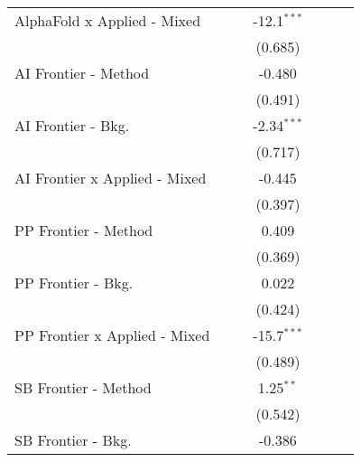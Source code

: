 \begin{tabular}{lcccccc}
   AlphaFold x Applied - Mixed   &              &               & -12.1$^{***}$ &             &        &   \\   
                                 &              &               & (0.685)       &             &        &   \\   
   AI Frontier - Method          &              &               & -0.480        &             &        &   \\   
                                 &              &               & (0.491)       &             &        &   \\   
   AI Frontier - Bkg.            &              &               & -2.34$^{***}$ &             &        &   \\   
                                 &              &               & (0.717)       &             &        &   \\   
   AI Frontier x Applied - Mixed &              &               & -0.445        &             &        &   \\   
                                 &              &               & (0.397)       &             &        &   \\   
   PP Frontier - Method          &              &               & 0.409         &             &        &   \\   
                                 &              &               & (0.369)       &             &        &   \\   
   PP Frontier - Bkg.            &              &               & 0.022         &             &        &   \\   
                                 &              &               & (0.424)       &             &        &   \\   
   PP Frontier x Applied - Mixed &              &               & -15.7$^{***}$ &             &        &   \\   
                                 &              &               & (0.489)       &             &        &   \\   
   SB Frontier - Method          &              &               & 1.25$^{**}$   &             &        &   \\   
                                 &              &               & (0.542)       &             &        &   \\   
   SB Frontier - Bkg.            &              &               & -0.386        &             &        &   \\   

\end{tabular}
